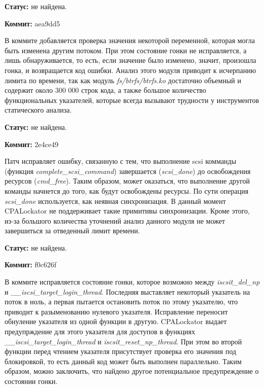 \textbf{Статус:} не найдена.

\vspace{1cm}

\textbf{Коммит:} aea9dd5

В коммите добавляется проверка значения некоторой переменной, которая могла быть изменена другим потоком. 
При этом состояние гонки не исправляется, а лишь обнаруживается, то есть, если значение было изменено, значит, произошла гонка, и возвращается код ошибки.
Анализ этого модуля приводит к исчерпанию лимита по времени, так как модуль \textit{fs/btrfs/btrfs.ko} достаточно объемный и содержит около 300 000 строк кода, а также большое количество функциональных указателей, которые всегда вызывают трудности у инструментов статического анализа.

\textbf{Статус:} не найдена.

\vspace{1cm}

\textbf{Коммит:} 2e4ce49

Патч исправляет ошибку, связанную с тем, что выполнение scsi комманды (функция \textit{complete\_scsi\_command}) завершается (\textit{scsi\_done}) до освобождения ресурсов (\textit{cmd\_free}).
Таким образом, может оказаться, что выполнение другой команды начнется до того, как будут освобождены ресурсы. 
По сути операция \textit{scsi\_done} используется, как неявная синхронизация.
В данный момент CPALockator не поддерживает такие примитивы синхронизации.
Кроме этого, из-за большого количества уточнений анализ данного модуля не может завершиться за отведенный лимит времени.

\textbf{Статус:} не найдена.

\vspace{1cm}

\textbf{Коммит:} f0c626f

В коммите исправляется состояние гонки, которое возможно между \textit{iscsit\_del\_np} и \textit{\_\_iscsi\_target\_login\_thread}.
Последняя выставляет некоторый указатель на поток в ноль, а первая пытается остановить поток по этому указателю, что приводит к разыменованию нулевого указателя.
Исправление переносит обнуление указателя из одной функции в другую.
CPALockator выдает предупрждение для этого указателя для доступов в функциях \textit{\_\_iscsi\_target\_login\_thread} и \textit{iscsit\_reset\_np\_thread}.
При этом во второй функции перед чтением указателя присутствует проверка его значения под блокировкой, то есть данный код может быть выполнен параллельно.
Таким образом, можно заключить, что найдено другое потенциальное предупреждение о состоянии гонки.

